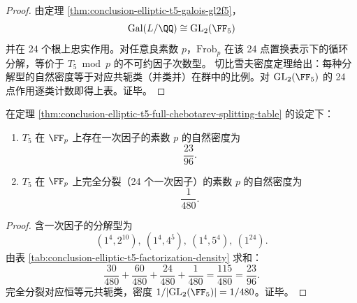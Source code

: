 \begin{proof}
由定理 \ref{thm:conclusion-elliptic-t5-galois-gl2f5}，
\[
\mathrm{Gal}(L/\QQ)\cong \mathrm{GL}_2(\FF_5)
\]
并在 24 个根上忠实作用。对任意良素数 \(p\)，\(\mathrm{Frob}_p\) 在该 24 点置换表示下的循环分解，等价于 \(T_5\bmod p\) 的不可约因子次数型。
切比雪夫密度定理给出：每种分解型的自然密度等于对应共轭类（并类并）在群中的比例。对 \(\mathrm{GL}_2(\FF_5)\) 的 24 点作用逐类计数即得上表。证毕。
\end{proof}

\begin{corollary}[模素数可解性与完全分裂密度]\label{cor:conclusion-elliptic-t5-solvability-and-total-splitting-density}
在定理 \ref{thm:conclusion-elliptic-t5-full-chebotarev-splitting-table} 的设定下：
\begin{enumerate}
  \item \(T_5\) 在 \(\FF_p\) 上存在一次因子的素数 \(p\) 的自然密度为
  \[
  \frac{23}{96}.
  \]
  \item \(T_5\) 在 \(\FF_p\) 上完全分裂（24 个一次因子）的素数 \(p\) 的自然密度为
  \[
  \frac{1}{480}.
  \]
\end{enumerate}
\end{corollary}
\begin{proof}
含一次因子的分解型为
\[
(1^4,2^{10}),\ (1^4,4^5),\ (1^4,5^4),\ (1^{24}).
\]
由表 \ref{tab:conclusion-elliptic-t5-factorization-density} 求和：
\[
\frac{30}{480}+\frac{60}{480}+\frac{24}{480}+\frac{1}{480}
=\frac{115}{480}
=\frac{23}{96}.
\]
完全分裂对应恒等元共轭类，密度 \(1/|\mathrm{GL}_2(\FF_5)|=1/480\)。证毕。
\end{proof}

